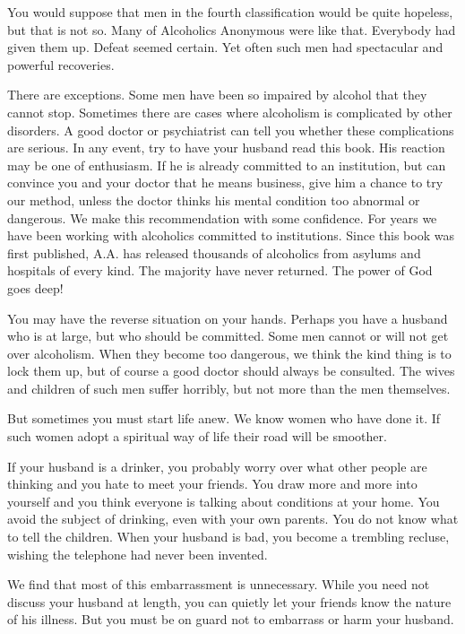 \begin{biblechapter}
You would suppose that men in the fourth classification would be quite hopeless, but that is not so.  Many of Alcoholics Anonymous were like that.  Everybody had given them up.  Defeat seemed certain.  Yet often such men had spectacular and powerful recoveries.

There are exceptions.  Some men have been so impaired by alcohol that they cannot stop.  Sometimes there are cases where alcoholism is complicated by other disorders.  A good doctor or psychiatrist can tell you whether these complications are serious.  In any event, try to have your husband read this book.  His reaction may be one of enthusiasm.  If he is already committed to an institution, but can convince you and your doctor that he means business, give him a chance to try our method, unless the doctor thinks his mental condition too abnormal or dangerous.  We make this recommendation with some confidence.  For years we have been working with alcoholics committed to institutions.  Since this book was first published, A.A. has released thousands of alcoholics from asylums and hospitals of every kind.  The majority have never returned.  The power of God goes deep!

You may have the reverse situation on your hands.  Perhaps you have a husband who is at large, but who should be committed.  Some men cannot or will not get over alcoholism.  When they become too dangerous, we think the kind thing is to lock them up, but of course a good doctor should always be consulted.  The wives and children of such men suffer horribly, but not more than the men themselves.

But sometimes you must start life anew.  We know women who have done it.  If such women adopt a spiritual way of life their road will be smoother.

If your husband is a drinker, you probably worry over what other people are thinking and you hate to meet your friends.  You draw more and more into yourself and you think everyone is talking about conditions at your home.  You avoid the subject of drinking, even with your own parents.  You do not know what to tell the children.  When your husband is bad, you become a trembling recluse, wishing the telephone had never been invented.

We find that most of this embarrassment is unnecessary.  While you need not discuss your husband at length, you can quietly let your friends know the nature of his illness.  But you must be on guard not to embarrass or harm your husband.


\end{biblechapter}
